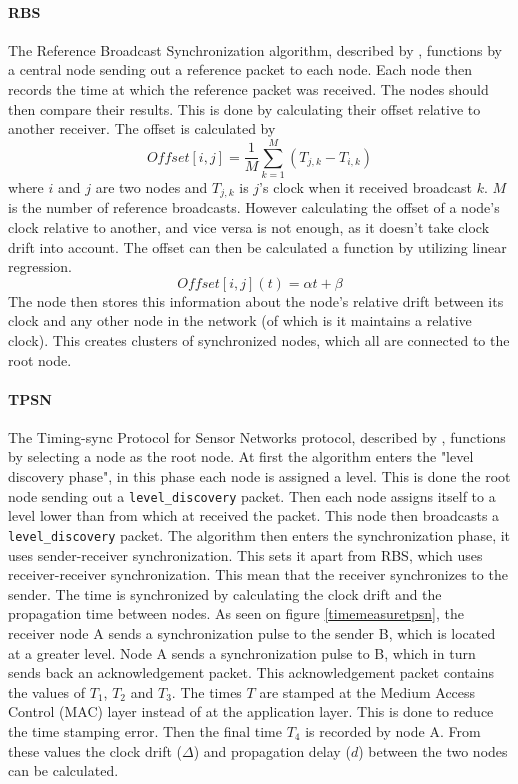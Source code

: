 \documentclass[a4paper,12pt]{article}
\begin{document}
    \paragraph{RBS} The Reference Broadcast Synchronization algorithm, described by \citet{ElsonGirodEstrin02},  functions by a central node sending out a reference packet to each node. Each node then records the time at which the reference packet was received. %
    The nodes should then compare their results. This is done by calculating their offset relative to another receiver. The offset is calculated by 
    \begin{equation}
        \label{offsetcalc}
        \textit{Offset} [i,j] = \frac{1}{M}\sum^M_{k=1} (T_{j,k} - T_{i,k})
    \end{equation}
    where $i$ and $j$ are two nodes and $T_{j,k}$ is $j$'s clock when it received broadcast $k$. $M$ is the number of reference broadcasts.  %
    However calculating the offset of a node's clock relative to another, and vice versa is not enough, as it doesn't take clock drift into account. The offset can then be calculated a function by utilizing linear regression. 
    $$\textit{Offset}[i,j](t) = \alpha t + \beta$$
    The node then stores this information about the node's relative drift between its clock and any other node in the network (of which is it maintains a relative clock). This creates clusters of synchronized nodes, which all are connected to the root node.
    
    \paragraph{TPSN} The Timing-sync Protocol for Sensor Networks protocol, described by \citet{GaneriwalEtAl03}, functions by selecting a node as the root node. At first the algorithm enters the "level discovery phase", in this  phase each node is assigned a level. This is done the root node sending out a \texttt{level\_discovery} packet. Then each node assigns itself to a level lower than from which at received the packet. This node then broadcasts a \texttt{level\_discovery} packet. The algorithm then enters the synchronization phase, it uses sender-receiver synchronization. This sets it apart from RBS, which uses receiver-receiver synchronization. This mean that the receiver synchronizes to the sender. The time is synchronized by calculating the clock drift and the propagation time between nodes. As seen on figure \ref{timemeasuretpsn}, the receiver node A sends a synchronization pulse to the sender B, which is located at a greater level. Node A sends a synchronization pulse to B, which in turn sends back an acknowledgement packet. This acknowledgement packet contains the values of $T_1$, $T_2$ and $T_3$. The times $T$ are stamped at the Medium Access Control (MAC) layer instead of at the application layer. This is done to reduce the time stamping error.  Then the final time $T_4$ is recorded by node A.  From these values the clock drift ($\Delta$) and propagation delay ($d$) between the two nodes can be calculated. 
    
\end{document}
